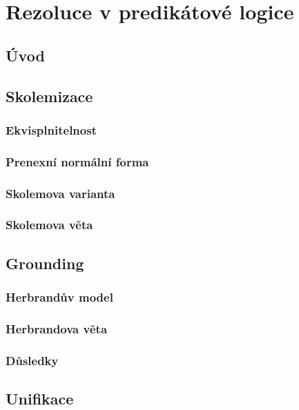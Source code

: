 \chapter{Rezoluce v predikátové logice} 
\label{chapter:predicate-resolution}


\section{Úvod}


\section{Skolemizace}

\subsection{Ekvisplnitelnost}

\subsection{Prenexní normální forma}

\subsection{Skolemova varianta}

\subsection{Skolemova věta}


\section{Grounding}

\subsection{Herbrandův model}

\subsection{Herbrandova věta}

\subsection{Důsledky}


\section{Unifikace}

